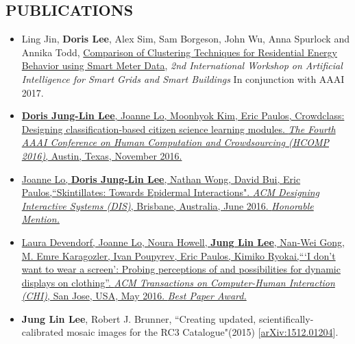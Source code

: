 \documentclass{res}
\begin{document}
\begin{resume}
\section{PUBLICATIONS}
\begin{itemize}
\item Ling Jin, \textbf{Doris Lee}, Alex Sim, Sam Borgeson, John Wu, Anna Spurlock and Annika Todd, \href{https://sdm.lbl.gov/perf/AISGSB2017-final2.pdf}{Comparison of Clustering Techniques for Residential Energy Behavior using Smart Meter Data}, \textit{2nd International Workshop on Artificial Intelligence for Smart Grids and Smart Buildings} In conjunction with AAAI 2017.
\item \href{http://aaai.org/ocs/index.php/HCOMP/HCOMP16/paper/viewFile/14027/13638}{\textbf{Doris Jung-Lin Lee}, Joanne Lo, Moonhyok Kim, Eric Paulos, Crowdclass: Designing classification-based citizen science learning modules. \textit{The Fourth AAAI Conference on Human Computation and Crowdsourcing (HCOMP 2016)}, Austin, Texas, November 2016.}
\item \href{http://dl.acm.org/citation.cfm?id=2901885&CFID=765226474&CFTOKEN=46922780}{Joanne Lo, \textbf{Doris Jung-Lin Lee}, Nathan Wong, David Bui, Eric Paulos,``Skintillates: Towards Epidermal Interactions".  \textit{ACM Designing Interactive Systems (DIS)}, Brisbane, Australia, June 2016. \textit{Honorable Mention.}}
\item \href{http://dl.acm.org/citation.cfm?id=2858192&CFID=765226474&CFTOKEN=46922780}{Laura Devendorf, Joanne Lo, Noura Howell, \textbf{Jung Lin Lee}, Nan-Wei Gong, M. Emre Karagozler, Ivan  Poupyrev, Eric Paulos, Kimiko Ryokai,``\hspace{1pt}`I don’t want to wear a screen': Probing perceptions of and  possibilities for dynamic displays on clothing''. \textit{ACM Transactions on Computer-Human Interaction (CHI)}, San Jose, USA, May 2016. \textit{Best Paper Award.}}
\item \textbf{Jung Lin Lee}, Robert J. Brunner, ``Creating updated, scientifically-calibrated mosaic images for the RC3 Catalogue"(2015) [\href{http://arxiv.org/abs/1512.01204}{arXiv:1512.01204}]. 
\end{itemize}

\end{resume}
\end{document}
